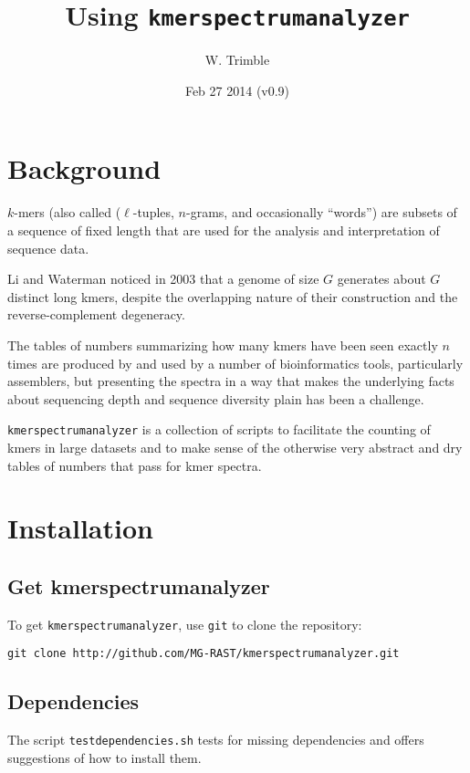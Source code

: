 \documentclass[11pt,fullpage]{article}
\begin{document}
\author{W. Trimble}
\date{Feb 27 2014 (v0.9)}
\title{Using \texttt{kmerspectrumanalyzer} }
\maketitle
{}
\section{Background}
$k$-mers (also called ($\ell$-tuples, $n$-grams, and occasionally ``words'') are
subsets of a sequence of fixed length that are used for the analysis and
interpretation of sequence data.

Li and Waterman noticed in 2003 that a genome of size $G$ generates about $G$ distinct
long kmers, despite the overlapping nature of their construction and the reverse-complement
degeneracy.

The tables of numbers summarizing how many kmers have been seen exactly $n$ times
are produced by and used by a number of bioinformatics tools, particularly assemblers,
but presenting the spectra in a way that makes the underlying
facts about sequencing depth and sequence diversity plain has been a challenge.

\texttt{kmerspectrumanalyzer} is a collection of scripts to facilitate the counting of
kmers in large datasets and to make sense of the otherwise very abstract and dry tables
of numbers that pass for kmer spectra.

\section{Installation}
\subsection{Get kmerspectrumanalyzer}
To get \texttt{kmerspectrumanalyzer}, use \texttt{git} to clone the repository:
\begin{verbatim}
git clone http://github.com/MG-RAST/kmerspectrumanalyzer.git
\end{verbatim}

\subsection{Dependencies}
The script \texttt{testdependencies.sh} tests for missing dependencies and
offers suggestions of how to install them.
\end{document}
